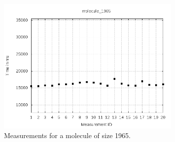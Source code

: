 \documentclass[a4paper,12pt]{article}
\begin{document}
\begin{figure}[!h]
  \centering
    \includegraphics[width=0.8\textwidth]{images/solver-perf-molecule_1965.png}
  \caption{Measurements for a molecule of size 1965.}
\end{figure}
\end{document}
